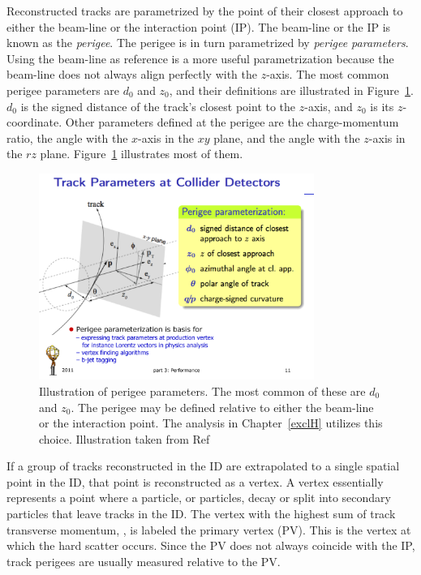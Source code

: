 \par Reconstructed tracks are parametrized by the point of their 
closest approach to either the beam-line or the interaction point (IP). The beam-line or 
the IP is known as the {\it perigee}. The perigee is in turn parametrized by {\it perigee parameters}. 
 Using the beam-line as reference is a more useful parametrization because the beam-line does not always 
align perfectly with the $z$-axis. The most common perigee parameters are $d_0$ and $z_0$, and their 
definitions are illustrated in Figure~\ref{fig:impctPV}. $d_0$ is the signed distance of the track's 
closest point to the $z$-axis, and $z_0$ is its $z$-coordinate. Other parameters defined at the perigee are the charge-momentum 
ratio, the angle with the $x$-axis in the $xy$ plane, and the angle with the $z$-axis 
in the $rz$ plane. Figure~\ref{fig:impctPV} illustrates most of them.  
 
\begin{figure}[!h]
\centering
   \includegraphics[width=0.8\textwidth]{figures/trkImp.pdf}
	\caption{Illustration of perigee parameters. The most common of these are $d_0$ and $z_0$. The perigee 
may be defined relative to either the beam-line or the interaction point. The analysis in Chapter~\ref{exclH} 
utilizes this choice. Illustration taken from Ref~\cite{ATLAS:trkImp}}
	\label{fig:impctPV}
\end{figure}

\par If a group of tracks reconstructed in the ID are extrapolated to a single spatial 
point in the ID, that point is reconstructed as a vertex. A vertex essentially represents 
a point where a particle, or particles, decay or split into secondary particles that leave 
tracks in the ID. The vertex with the highest sum of track transverse momentum, \pt, is labeled the 
primary vertex (PV). This is the vertex at which the hard scatter occurs. Since the PV does not 
always coincide with the IP, track perigees are usually measured relative to the PV.  

